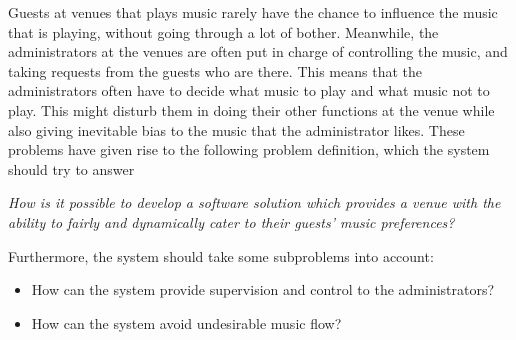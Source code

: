 Guests at venues that plays music rarely have the chance to influence the music that is playing, without going through a lot of bother. Meanwhile, the administrators at the venues are often put in charge of controlling the music, and taking requests from the guests who are there. This means that the administrators often have to decide what music to play and what music not to play. This might disturb them in doing their other functions at the venue while also giving inevitable bias to the music that the administrator likes.
These problems have given rise to the following problem definition, which the system should try to answer

\begin{center}
\textit{How is it possible to develop a software solution which provides a venue with the ability to fairly and dynamically cater to their guests' music preferences?}
\end{center}

Furthermore, the system should take some subproblems into account:
\begin{itemize}
\item How can the system provide supervision and control to the administrators?
\item How can the system avoid undesirable music flow?
\end{itemize}